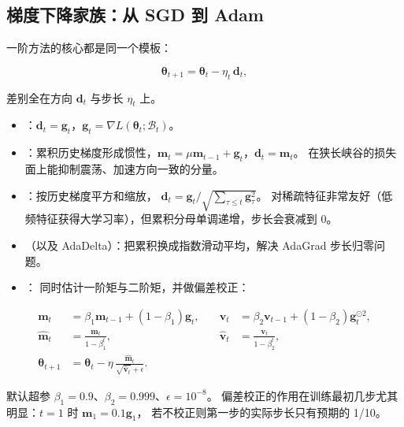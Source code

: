 \subsection{梯度下降家族：从 SGD 到 Adam}

一阶方法的核心都是同一个模板：

\begin{equation}
\bm{\theta}_{t+1} = \bm{\theta}_t - \eta_t\, \bm{d}_t ,
\label{eq:gd-template}
\end{equation}

差别全在方向 $\bm{d}_t$ 与步长 $\eta_t$ 上。

\begin{itemize}
  \item {}：$\bm{d}_t = \bm{g}_t$，$\bm{g}_t = \nabla L(\bm{\theta}_t;\mathcal{B}_t)$。
  \item {}：累积历史梯度形成惯性，$\bm{m}_t = \mu \bm{m}_{t-1} + \bm{g}_t$，$\bm{d}_t = \bm{m}_t$。
        在狭长峡谷的损失面上能抑制震荡、加速方向一致的分量。
  \item {}：按历史梯度平方和缩放，
        $\bm{d}_t = \bm{g}_t / \sqrt{\sum_{\tau\le t}\bm{g}_\tau^2}$。
        对稀疏特征非常友好（低频特征获得大学习率），但累积分母单调递增，步长会衰减到 0。
  \item {}（以及 AdaDelta）：把累积换成指数滑动平均，解决 AdaGrad 步长归零问题。
  \item {} \cite{kingma2015adam}：
        同时估计一阶矩与二阶矩，并做偏差校正：
\end{itemize}

\begin{equation}
\begin{aligned}
\bm{m}_t &= \beta_1 \bm{m}_{t-1} + (1-\beta_1)\bm{g}_t, &\quad
\bm{v}_t &= \beta_2 \bm{v}_{t-1} + (1-\beta_2)\bm{g}_t^{\odot 2}, \\
\hat{\bm{m}}_t &= \frac{\bm{m}_t}{1-\beta_1^{t}}, &\quad
\hat{\bm{v}}_t &= \frac{\bm{v}_t}{1-\beta_2^{t}}, \\
\bm{\theta}_{t+1} &= \bm{\theta}_t - \eta\, \frac{\hat{\bm{m}}_t}{\sqrt{\hat{\bm{v}}_t} + \epsilon} .
\end{aligned}
\label{eq:adam}
\end{equation}

默认超参 $\beta_1 = 0.9$、$\beta_2 = 0.999$、$\epsilon = 10^{-8}$。
偏差校正的作用在训练最初几步尤其明显：$t=1$ 时 $\bm{m}_1 = 0.1\bm{g}_1$，
若不校正则第一步的实际步长只有预期的 1/10。

